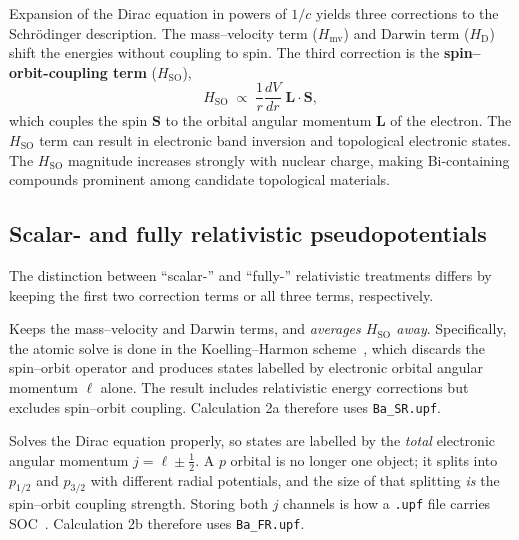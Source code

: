 \documentclass[11pt]{article}
\begin{document}
Expansion of the Dirac equation in powers of $1/c$ yields three corrections to the Schr\"odinger
description. The mass--velocity term ($H_{\mathrm{mv}}$) and Darwin term ($H_{\mathrm D}$) shift the
energies without coupling to spin. The third correction is the \textbf{spin--orbit-coupling term}
($H_{\mathrm{SO}}$),
\begin{equation}
  H_{\text{SO}} \;\propto\; \frac{1}{r}\frac{dV}{dr}\;\mathbf{L}\cdot\mathbf{S},
  \label{eq:soc}
\end{equation}
which couples the spin $\mathbf{S}$ to the orbital angular momentum $\mathbf{L}$ of the electron.
The $H_{\mathrm{SO}}$ term can result in electronic band inversion and topological electronic states.
The $H_{\mathrm{SO}}$ magnitude increases strongly with nuclear charge, making Bi-containing
compounds prominent among candidate topological materials.

\subsection{Scalar- and fully relativistic pseudopotentials}

The distinction between ``scalar-'' and ``fully-'' relativistic treatments differs by keeping the
first two correction terms or all three terms, respectively.

\begin{description}[leftmargin=1.4em,style=nextline]
\item[Scalar-relativistic (SR).] Keeps the mass--velocity and Darwin terms, and \emph{averages
$H_{\text{SO}}$ away}. Specifically, the atomic solve is done in the Koelling--Harmon
scheme~\cite{koelling1977}, which discards the spin--orbit operator and produces states labelled by
electronic orbital angular momentum $\ell$ alone. The result includes relativistic energy corrections but
excludes spin--orbit coupling. Calculation 2a therefore uses \texttt{Ba\_SR.upf}.
\item[Fully-relativistic (FR).] Solves the Dirac equation properly, so states are labelled by the
\emph{total} electronic angular momentum $j = \ell \pm \tfrac12$. A $p$ orbital is no longer one object; it
splits into $p_{1/2}$ and $p_{3/2}$ with different radial potentials, and the size of that splitting
\emph{is} the spin--orbit coupling strength. Storing both $j$ channels is how a \texttt{.upf} file carries
SOC~\cite{bachelet1982,kleinman1980}. Calculation 2b therefore uses \texttt{Ba\_FR.upf}.
\end{description}
\end{document}

